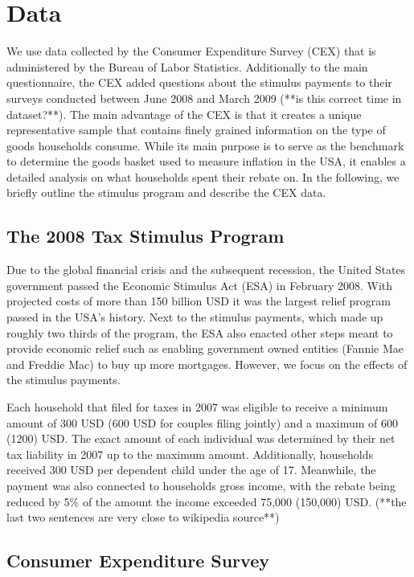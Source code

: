 \newpage
\section{Data} \label{sec:data}
We use data collected by the Consumer Expenditure Survey (CEX) that is administered by the Bureau of Labor Statistics. Additionally to the main questionnaire, the CEX added questions about the stimulus payments to their surveys conducted between June 2008 and March 2009 (**is this correct time in dataset?**). The main advantage of the CEX is that it creates a unique representative sample that contains finely grained information on the type of goods households consume. While its main purpose is to serve as the benchmark to determine the goods basket used to measure inflation in the USA, it enables a detailed analysis on what households spent their rebate on. In the following, we briefly outline the stimulus program and describe the CEX data. 

\subsection{The 2008 Tax Stimulus Program} 

Due to the global financial crisis and the subsequent recession, the United States government passed the Economic Stimulus Act (ESA) in February 2008. With projected costs of more than 150 billion USD it was the largest relief program passed in the USA's history. Next to the stimulus payments, which made up roughly two thirds of the program, the ESA also enacted other steps meant to provide economic relief such as enabling government owned entities (Fannie Mae and Freddie Mac) to buy up more mortgages. However, we focus on the effects of the stimulus payments. 

Each household that filed for taxes in 2007 was eligible to receive a minimum amount of 300 USD (600 USD for couples filing jointly) and a maximum of 600 (1200) USD. The exact amount of each individual was determined by their net tax liability in 2007 up to the maximum amount. Additionally, households received 300 USD per dependent child under the age of 17. Meanwhile, the payment was also connected to households gross income, with the rebate being reduced by 5\% of the amount the income exceeded 75,000 (150,000) USD. (**the last two sentences are very close to wikipedia source**) 

\subsection{Consumer Expenditure Survey} 

